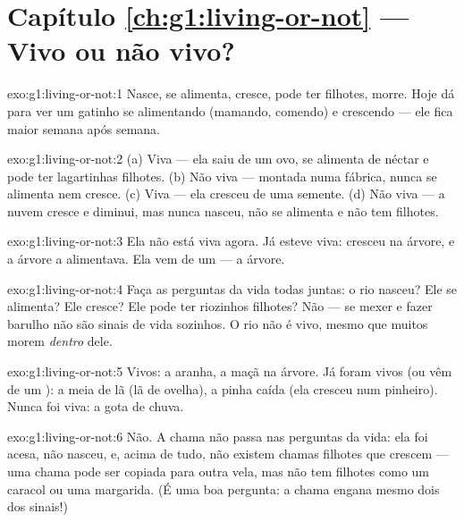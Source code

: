 \section*{Capítulo \ref{ch:g1:living-or-not} --- Vivo ou não vivo?}

\begin{solution}{exo:g1:living-or-not:1}
Nasce, se alimenta, cresce, pode ter filhotes, morre. Hoje dá para
ver um gatinho se alimentando (mamando, comendo) e crescendo --- ele
fica maior semana após semana.
\end{solution}

\begin{solution}{exo:g1:living-or-not:2}
(a) Viva --- ela saiu de um ovo, se alimenta de néctar e pode ter
lagartinhas filhotes. (b) Não viva --- montada numa fábrica, nunca
se alimenta nem cresce. (c) Viva --- ela cresceu de uma semente.
(d) Não viva --- a nuvem cresce e diminui, mas nunca nasceu, não se
alimenta e não tem filhotes.
\end{solution}

\begin{solution}{exo:g1:living-or-not:3}
Ela não está viva agora. Já esteve viva: cresceu na árvore, e a
árvore a alimentava. Ela vem de um  --- a árvore.
\end{solution}

\begin{solution}{exo:g1:living-or-not:4}
Faça as perguntas da vida todas juntas: o rio nasceu? Ele se
alimenta? Ele cresce? Ele pode ter riozinhos filhotes? Não --- se
mexer e fazer barulho não são sinais de vida sozinhos. O rio não é
vivo, mesmo que muitos  morem \emph{dentro} dele.
\end{solution}

\begin{solution}{exo:g1:living-or-not:5}
Vivos: a aranha, a maçã na árvore. Já foram vivos (ou vêm de um ): a meia de lã (lã de ovelha), a pinha caída (ela cresceu num
pinheiro). Nunca foi viva: a gota de chuva.
\end{solution}

\begin{solution}{exo:g1:living-or-not:6}
Não. A chama não passa nas perguntas da vida: ela foi acesa, não
nasceu, e, acima de tudo, não existem chamas filhotes que crescem
--- uma chama pode ser copiada para outra vela, mas não tem
filhotes como um caracol ou uma margarida. (É uma boa pergunta: a
chama engana mesmo dois dos sinais!)
\end{solution}

